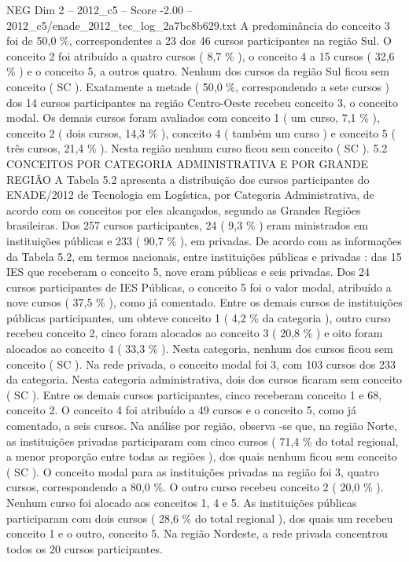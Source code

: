 \begin{textsample}{NEG Dim 2 – 2012\_c5 – Score -2.00 – 2012\_c5/enade\_2012\_tec\_log\_2a7bc8b629.txt}
A predominância do conceito 3 foi de 50,0 \%, correspondentes a 23 dos 46 cursos participantes na região Sul.
O conceito 2 foi atribuído a quatro cursos ( 8,7 \% ), o conceito 4 a 15 cursos ( 32,6 \% ) e o conceito 5, a outros quatro.
Nenhum dos cursos da região Sul ficou sem conceito ( SC ).
Exatamente a metade ( 50,0 \%, correspondendo a sete cursos ) dos 14 cursos participantes na região Centro-Oeste recebeu conceito 3, o conceito modal.
Os demais cursos foram avaliados com conceito 1 ( um curso, 7,1 \% ), conceito 2 ( dois cursos, 14,3 \% ), conceito 4 ( também um curso ) e conceito 5 ( três cursos, 21,4 \% ).
Nesta região nenhum curso ficou sem conceito ( SC ). 5.2 CONCEITOS POR CATEGORIA ADMINISTRATIVA E POR GRANDE REGIÃO A Tabela 5.2 apresenta a distribuição dos cursos participantes do ENADE/2012 de Tecnologia em Logística, por Categoria Administrativa, de acordo com os conceitos por eles alcançados, segundo as Grandes Regiões brasileiras.
Dos 257 cursos participantes, 24 ( 9,3 \% ) eram ministrados em instituições públicas e 233 ( 90,7 \% ), em privadas.
De acordo com as informações da Tabela 5.2, em termos nacionais, entre instituições públicas e privadas : das 15 IES que receberam o conceito 5, nove eram públicas e seis privadas.
Dos 24 cursos participantes de IES Públicas, o conceito 5 foi o valor modal, atribuído a nove cursos ( 37,5 \% ), como já comentado.
Entre os demais cursos de instituições públicas participantes, um obteve conceito 1 ( 4,2 \% da categoria ), outro curso recebeu conceito 2, cinco foram alocados ao conceito 3 ( 20,8 \% ) e oito foram alocados ao conceito 4 ( 33,3 \% ).
Nesta categoria, nenhum dos cursos ficou sem conceito ( SC ).
Na rede privada, o conceito modal foi 3, com 103 cursos dos 233 da categoria.
Nesta categoria administrativa, dois dos cursos ficaram sem conceito ( SC ).
Entre os demais cursos participantes, cinco receberam conceito 1 e 68, conceito 2.
O conceito 4 foi atribuído a 49 cursos e o conceito 5, como já comentado, a seis cursos.
Na análise por região, observa -se que, na região Norte, as instituições privadas participaram com cinco cursos ( 71,4 \% do total regional, a menor proporção entre todas as regiões ), dos quais nenhum ficou sem conceito ( SC ).
O conceito modal para as instituições privadas na região foi 3, quatro cursos, correspondendo a 80,0 \%.
O outro curso recebeu conceito 2 ( 20,0 \% ).
Nenhum curso foi alocado aos conceitos 1, 4 e 5.
As instituições públicas participaram com dois cursos ( 28,6 \% do total regional ), dos quais um recebeu conceito 1 e o outro, conceito 5.
Na região Nordeste, a rede privada concentrou todos os 20 cursos participantes.

\end{textsample}
